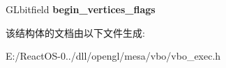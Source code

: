 \begin{DoxyCompactItemize}
\begin{tabbing}
\end{tabbing}\item 
\mbox{\label{structvbo__exec__context_a839b48bfb8032d8cf0c7a91dcee2159f}} 
G\+Lbitfield {\bfseries begin\+\_\+vertices\+\_\+flags}
\end{DoxyCompactItemize}


该结构体的文档由以下文件生成\+:\begin{DoxyCompactItemize}
\item 
E\+:/\+React\+O\+S-\/0../dll/opengl/mesa/vbo/vbo\+\_\+exec.\+h\end{DoxyCompactItemize}
